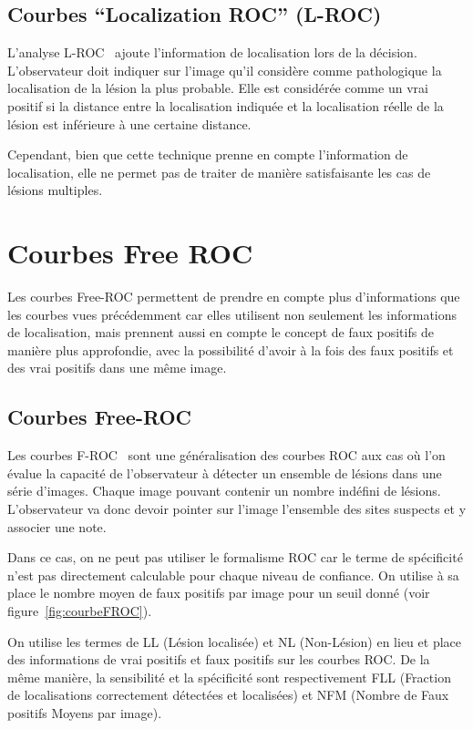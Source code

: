 \subsection{Courbes ``Localization ROC'' (L-ROC)}

L'analyse L-ROC~\cite{farquhar1999roc} ajoute l'information de localisation lors de la décision. L'observateur doit indiquer sur l'image qu'il considère comme pathologique la localisation de la lésion la plus probable. Elle est considérée comme un vrai positif si la distance entre la localisation indiquée et la localisation réelle de la lésion est inférieure à une certaine distance.

Cependant, bien que cette technique prenne en compte l'information de localisation, elle ne permet pas de traiter de manière satisfaisante les cas de lésions multiples.


\section{Courbes Free ROC}	

Les courbes Free-ROC permettent de prendre en compte plus d'informations que les courbes vues précédemment car elles utilisent non seulement les informations de localisation, mais prennent aussi en compte le concept de faux positifs de manière plus approfondie, avec la possibilité d'avoir à la fois des faux positifs et des vrai positifs dans une même image.



\subsection{Courbes Free-ROC}
\label{lab:FROC}

Les courbes F-ROC~\cite{bunch1978free} sont une généralisation des courbes ROC aux cas où l'on évalue la capacité de l'observateur à détecter un ensemble de lésions dans une série d'images. Chaque image pouvant contenir un nombre indéfini de lésions. L'observateur va donc devoir pointer sur l'image l'ensemble des sites suspects et y associer une note.

Dans ce cas, on ne peut pas utiliser le formalisme ROC car le terme de spécificité n'est pas directement calculable pour chaque niveau de confiance. On utilise à sa place le nombre moyen de faux positifs par image pour un seuil donné (voir figure~\ref{fig:courbeFROC}).

On utilise les termes de LL (Lésion localisée) et NL (Non-Lésion) en lieu et place des informations de vrai positifs et faux positifs sur les courbes ROC. De la même manière, la sensibilité et la spécificité sont respectivement FLL (Fraction de localisations correctement détectées et localisées) et NFM (Nombre de Faux positifs Moyens par image).

